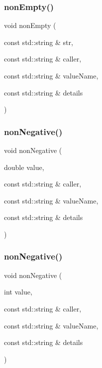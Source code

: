 \subsubsection{\texorpdfstring{non\+Empty()}{nonEmpty()}}
{\footnotesize\ttfamily void non\+Empty (\begin{DoxyParamCaption}\item[{const std\+::string \&}]{str,  }\item[{const std\+::string \&}]{caller,  }\item[{const std\+::string \&}]{value\+Name,  }\item[{const std\+::string \&}]{details }\end{DoxyParamCaption})}

\mbox{\label{namespacerequire_a1ea7fb60c9f1e4facc46b4fba5e0a924}} 
\subsubsection{\texorpdfstring{non\+Negative()}{nonNegative()}\hspace{0.1cm}{\footnotesize\ttfamily [1/3]}}
{\footnotesize\ttfamily void non\+Negative (\begin{DoxyParamCaption}\item[{double}]{value,  }\item[{const std\+::string \&}]{caller,  }\item[{const std\+::string \&}]{value\+Name,  }\item[{const std\+::string \&}]{details }\end{DoxyParamCaption})}

\mbox{\label{namespacerequire_a40cad20a5826d829aaf4083c27175b05}} 
\subsubsection{\texorpdfstring{non\+Negative()}{nonNegative()}\hspace{0.1cm}{\footnotesize\ttfamily [2/3]}}
{\footnotesize\ttfamily void non\+Negative (\begin{DoxyParamCaption}\item[{int}]{value,  }\item[{const std\+::string \&}]{caller,  }\item[{const std\+::string \&}]{value\+Name,  }\item[{const std\+::string \&}]{details }\end{DoxyParamCaption})}

